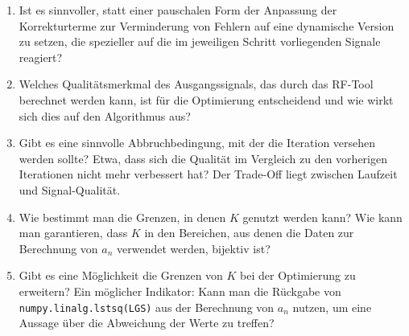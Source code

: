 \documentclass[../Report.tex]{subfiles}
\begin{document}
\begin{enumerate}
	\item 	Ist es sinnvoller, statt einer pauschalen Form der Anpassung der Korrekturterme zur Verminderung von Fehlern auf eine dynamische Version zu setzen, die spezieller auf die im jeweiligen Schritt vorliegenden Signale reagiert?
	
	\item	Welches Qualitätsmerkmal des Ausgangssignals, das durch das RF-Tool \cite{RF-Tool} berechnet werden kann, ist für die Optimierung entscheidend und wie wirkt sich dies auf den Algorithmus aus?
	
	\item	Gibt es eine sinnvolle Abbruchbedingung, mit der die Iteration versehen werden sollte? Etwa, dass sich die Qualität im Vergleich zu den vorherigen Iterationen nicht mehr verbessert hat? Der Trade-Off liegt zwischen Laufzeit und Signal-Qualität.
	
	\item	Wie bestimmt man die Grenzen, in denen $K$ genutzt werden kann? Wie kann man garantieren, dass $K$ in den Bereichen, aus denen die Daten zur Berechnung von $a_n$ verwendet werden, bijektiv ist?
	
	\item	Gibt es eine Möglichkeit die Grenzen von $K$ bei der Optimierung zu erweitern? Ein möglicher Indikator: Kann man die Rückgabe von \lstinline{numpy.linalg.lstsq(LGS)} aus der Berechnung von $a_n$ nutzen, um eine Aussage über die Abweichung der Werte zu treffen?
\end{enumerate}
\end{document}
